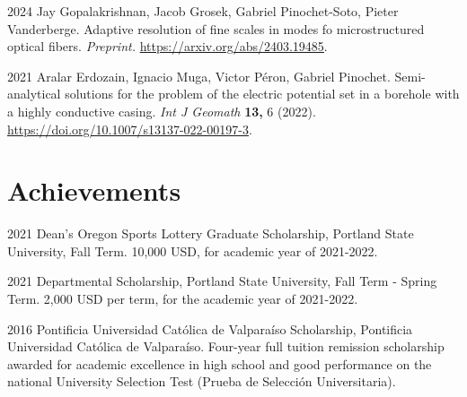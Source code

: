 \documentclass[12pt,letterpaper]{report}
\begin{document}
    \begin{tablist}

    \item[2024] \tab Jay Gopalakrishnan, Jacob Grosek, Gabriel Pinochet-Soto, Pieter Vanderberge. Adaptive resolution of fine scales in modes fo microstructured optical fibers. \textit{Preprint.}  \href{https://arxiv.org/abs/2403.19485}{https://arxiv.org/abs/2403.19485}.

	\item[2021] \tab Aralar Erdozain, Ignacio Muga, Victor P\'eron, Gabriel Pinochet. Semi-analytical solutions for the problem of the electric potential set in a borehole with a highly conductive casing. \textit{Int J Geomath} \textbf{13,} 6 (2022). \href{https://doi.org/10.1007/s13137-022-00197-3}{https://doi.org/10.1007/s13137-022-00197-3}.

    \end{tablist}

    \section*{Achievements}

    \begin{tablist}

        \item[2021] \tab Dean's Oregon Sports Lottery Graduate Scholarship, Portland State University, Fall Term. 10,000 USD, for academic year of 2021-2022.

        \item[2021] \tab Departmental Scholarship, Portland State University, Fall Term - Spring Term. 2,000 USD per term, for the academic year of 2021-2022.


        \item[2016] \tab Pontificia Universidad Cat\'olica de Valpara\'iso Scholarship, Pontificia Universidad Cat\'olica de Valpara\'iso. Four-year full tuition remission scholarship awarded for academic excellence in high school and good performance on the national University Selection Test (Prueba de Selecci\'on Universitaria).

    \end{tablist}

\end{document}
